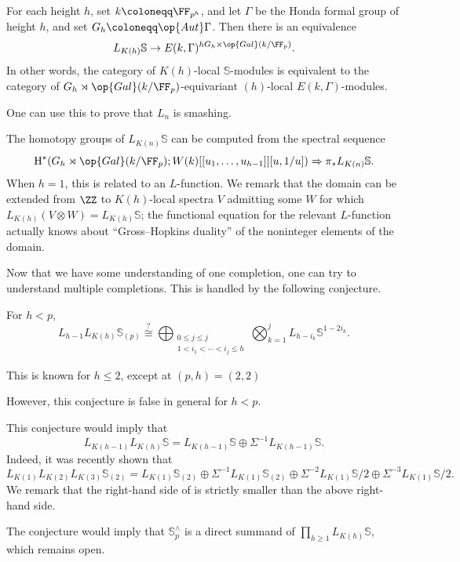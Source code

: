 \documentclass[../notes.tex]{subfiles}
\begin{document}
\begin{theorem}
	For each height $h$, set $k\coloneqq\FF_{p^h}$, and let $\Gamma$ be the Honda formal group of height $h$, and set $G_h\coloneqq\op{Aut}\Gamma$. Then there is an equivalence
	\[L_{K(h)}\mathbb S\to E(k,\Gamma)^{hG_h\times\op{Gal}(k/\FF_p)}.\]
	In other words, the category of $K(h)$-local $\mathbb S$-modules is equivalent to the category of $G_h\rtimes\op{Gal}(k/\FF_p)$-equivariant $(h)$-local $E(k,\Gamma)$-modules.
\end{theorem}
\begin{remark}
	One can use this to prove that $L_n$ is smashing.
\end{remark}
\begin{remark}
	The homotopy groups of $L_{K(n)}\mathbb S$ can be computed from the spectral sequence
	\[\mathrm H^*(G_h\rtimes\op{Gal}(k/\FF_p);W(k)[[u_1,\ldots,u_{h-1}]][u,1/u])\Rightarrow\pi_*L_{K(n)}\mathbb S.\]
	When $h=1$, this is related to an $L$-function. We remark that the domain can be extended from $\ZZ$ to $K(h)$-local spectra $V$ admitting some $W$ for which $L_{K(h)}(V\otimes W)=L_{K(h)}\mathbb S$; the functional equation for the relevant $L$-function actually knows about ``Gross--Hopkins duality'' of the noninteger elements of the domain.
\end{remark}
Now that we have some understanding of one completion, one can try to understand multiple completions. This is handled by the following conjecture.
\begin{conj}[Hopkins] \label{conj:hopkins}
	For $h<p$,
	\[L_{h-1}L_{K(h)}\mathbb S_{(p)}\stackrel?\cong\bigoplus_{\substack{0\le j\le j\\1<i_1<\cdots<i_j\le h}}\bigotimes_{k=1}^jL_{h-i_k}\mathbb S^{1-2i_k}.\]
\end{conj}
\begin{remark}
	This is known for $h\le2$, except at $(p,h)=(2,2)$
\end{remark}
However, this conjecture is false in general for $h<p$.
\begin{remark}
	This conjecture would imply that
	\[L_{K(h-1)}L_{K(h)}\mathbb S=L_{K(h-1)}\mathbb S\oplus\Sigma^{-1}L_{K(h-1)}\mathbb S.\]
	Indeed, it was recently shown that
	\[L_{K(1)}L_{K(2)}L_{K(3)}\mathbb S_{(2)}=L_{K(1)}\mathbb S_{(2)}\oplus\Sigma^{-1}L_{K(1)}\mathbb S_{(2)}\oplus\Sigma^{-2}L_{K(1)}\mathbb S/2\oplus\Sigma^{-3}L_{K(1)}\mathbb S/2.\]
	We remark that the right-hand side of  is strictly smaller than the above right-hand side.
\end{remark}
\begin{remark}
	The conjecture would imply that $\mathbb S^\land_p$ is a direct summand of $\prod_{h\ge1}L_{K(h)}\mathbb S$, which remains open.
\end{remark}
\end{document}
